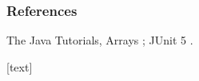 \documentclass[aspectratio=169,10pt,compress]{beamer}
\begin{document}
\begin{frame}[t,fragile] \frametitle{References}
	\small The Java Tutorials, Arrays \cite{TheJavaTutorialsArray}; JUnit 5 \cite{homeJunit}.

	\vspace{1em}
	[text]
	
	\tiny
\end{frame}




\begin{frame}[t,fragile]
	\begin{center}
		\vspace{4cm}
	\end{center}
\end{frame}
\end{document}
